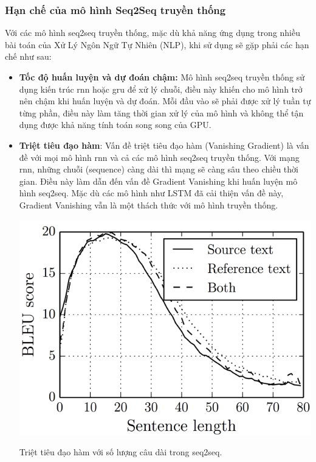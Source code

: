 \documentclass[a4paper, 12pt, openany]{book}
\begin{document}
\subsubsection{Hạn chế của mô hình Seq2Seq truyền thống}

Với các mô hình \acl{seq2seq} truyền thống, mặc dù khả năng ứng dụng trong nhiều bài toán của Xử Lý Ngôn Ngữ Tự Nhiên (NLP), khi sử dụng sẽ gặp phải các hạn chế như sau:

\begin{itemize}
    \item \textbf{Tốc độ huấn luyện và dự đoán chậm:} Mô hình \ac{seq2seq} truyền thống sử dụng kiến trúc \ac{rnn} hoặc \ac{gru} để xử lý chuỗi, điều này khiến cho mô hình trở nên chậm khi huấn luyện và dự đoán.
    Mỗi đầu vào sẽ phải được xử lý tuần tự từng phần, điều này làm tăng thời gian xử lý của mô hình và không thể tận dụng được khả năng tính toán song song của GPU.
    
    \item \textbf{Triệt tiêu đạo hàm}: Vấn đề triệt tiêu đạo hàm (Vanishing Gradient) là vấn đề với mọi mô hình \ac{rnn} và cả
    các mô hình \ac{seq2seq} truyền thống. Với mạng \ac{rnn}, những chuỗi (sequence) càng dài thì mạng sẽ càng sâu
    theo chiều thời gian. Điều này làm dẫn đến vấn đề Gradient Vanishing khi huấn luyện mô hình \ac{seq2seq}.
    Mặc dù các mô hình như LSTM đã cải thiện vấn đề này, Gradient Vanishing vẫn là một thách thức với mô hình truyền thống.

    \begin{minipage}{\linewidth}
        \captionsetup{type=figure}
        \centering
        \includegraphics[width=.8\linewidth]{./assets/images/seq2seq_limit.png}
        \caption{Triệt tiêu đạo hàm với số lượng câu dài trong \ac{seq2seq}.}
    \end{minipage}
    \vspace{0.5cm}


\end{itemize}
\end{document}
